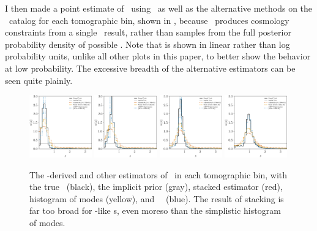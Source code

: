 I then made a point estimate of \nz\ using \Chippr\ as well as the alternative methods on the \pzpdf\ catalog for each tomographic bin, shown in , because \cosmolike\ produces cosmology constraints from a single \nz\ result, rather than samples from the full posterior probability density of possible \nz.
Note that  is shown in linear rather than log probability units, unlike all other plots in this paper, to better show the behavior at low probability.
The excessive breadth of the alternative estimators can be seen quite plainly.

\begin{figure}
	\begin{center}
		\includegraphics[width=0.24\textwidth]{figures/chippr/0single_lsst_lin_estimators.png}
		\includegraphics[width=0.24\textwidth]{figures/chippr/1single_lsst_lin_estimators.png}		\includegraphics[width=0.24\textwidth]{figures/chippr/2single_lsst_lin_estimators.png}
		\includegraphics[width=0.24\textwidth]{figures/chippr/3single_lsst_lin_estimators.png}
		\caption{
			The \chippr-derived and other estimators of \nz\ in each tomographic bin, with the true \nz\ (black), the implicit prior (gray), stacked estimator (red), histogram of modes (yellow), and \Chippr\ \mmle\ (blue).
			The result of stacking is far too broad for \lsst-like \pzpdf s, even moreso than the simplistic histogram of modes.
		}
	\end{center}
\end{figure}

